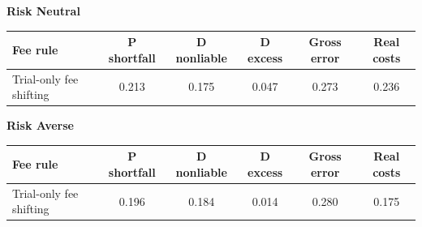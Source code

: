 \documentclass[10pt,border=5pt,varwidth=17cm]{standalone}
\begin{document}
\begingroup
\small
\setlength{\tabcolsep}{5pt}
\renewcommand{\arraystretch}{1.20}
\noindent\textbf{Risk Neutral}\par\smallskip
\noindent\begin{tabularx}{\linewidth}{@{}>{\raggedright\arraybackslash}Xccccc@{}}
\toprule
\textbf{Fee rule} & \textbf{P shortfall} & \textbf{D nonliable} & \textbf{D excess} & \textbf{Gross error} & \textbf{Real costs} \\
\midrule
Trial-only fee shifting & 0.213 & 0.175 & 0.047 & 0.273 & 0.236 \\
\bottomrule\end{tabularx}\par\medskip
\noindent\textbf{Risk Averse}\par\smallskip
\noindent\begin{tabularx}{\linewidth}{@{}>{\raggedright\arraybackslash}Xccccc@{}}
\toprule
\textbf{Fee rule} & \textbf{P shortfall} & \textbf{D nonliable} & \textbf{D excess} & \textbf{Gross error} & \textbf{Real costs} \\
\midrule
Trial-only fee shifting & 0.196 & 0.184 & 0.014 & 0.280 & 0.175 \\
\bottomrule\end{tabularx}\par\medskip
\endgroup
\end{document}
